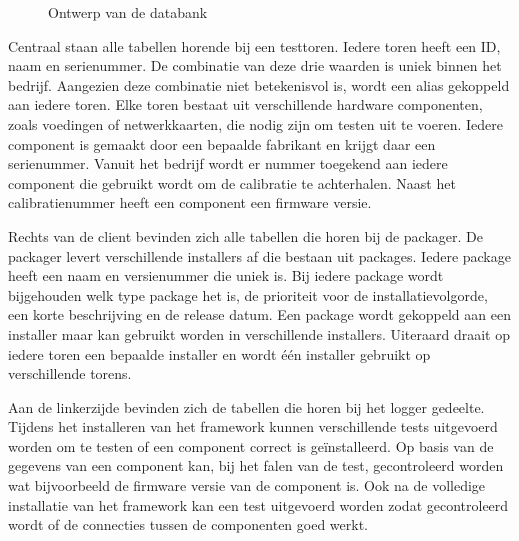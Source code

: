 \begin{figure}[!ht]
\centering
{}
\caption{Ontwerp van de databank}
\label{fig:databank}
\end{figure}

Centraal staan alle tabellen horende bij een testtoren.
Iedere toren heeft een ID, naam en serienummer. 
De combinatie van deze drie waarden is uniek binnen het bedrijf.
Aangezien deze combinatie niet betekenisvol is, wordt een alias gekoppeld aan iedere toren.
Elke toren bestaat uit verschillende hardware componenten, zoals voedingen of netwerkkaarten, die nodig zijn om testen uit te voeren.
Iedere component is gemaakt door een bepaalde fabrikant en krijgt daar een serienummer.
Vanuit het bedrijf wordt er nummer toegekend aan iedere component die gebruikt wordt om de calibratie te achterhalen.
Naast het calibratienummer heeft een component een firmware versie.

Rechts van de client bevinden zich alle tabellen die horen bij de packager.
De packager levert verschillende installers af die bestaan uit packages.
Iedere package heeft een naam en versienummer die uniek is.
Bij iedere package wordt bijgehouden welk type package het is, de prioriteit voor de installatievolgorde, een korte beschrijving en de release datum.
Een package wordt gekoppeld aan een installer maar kan gebruikt worden in verschillende installers.
Uiteraard draait op iedere toren een bepaalde installer en wordt één installer gebruikt op verschillende torens.

Aan de linkerzijde bevinden zich de tabellen die horen bij het logger gedeelte.
Tijdens het installeren van het framework kunnen verschillende tests uitgevoerd worden om te testen of een component correct is geïnstalleerd.
Op basis van de gegevens van een component kan, bij het falen van de test, gecontroleerd worden wat bijvoorbeeld de firmware versie van de component is.
Ook na de volledige installatie van het framework kan een test uitgevoerd worden zodat gecontroleerd wordt of de connecties tussen de componenten goed werkt.


